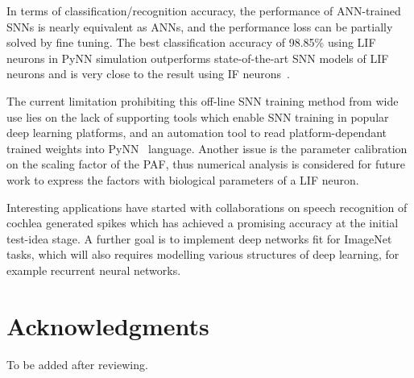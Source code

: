 \documentclass{article}
\begin{document}
In terms of classification/recognition accuracy, the performance of ANN-trained SNNs is nearly equivalent as ANNs, and the performance loss can be partially solved by fine tuning.
The best classification accuracy of 98.85\% using LIF neurons in PyNN simulation outperforms state-of-the-art SNN models of LIF neurons and is very close to the result using IF neurons~\cite{diehl2015fast}.

The current limitation prohibiting this off-line SNN training method from wide use lies on the lack of supporting tools which enable SNN training in popular deep learning platforms, and an automation tool to read platform-dependant trained weights into PyNN~\cite{davison2008pynn} language.
Another issue is the parameter calibration on the scaling factor of the PAF, thus numerical analysis is considered for future work to express the factors with biological parameters of a LIF neuron.

Interesting applications have started with collaborations on speech recognition of cochlea generated spikes which has achieved a promising accuracy at the initial test-idea stage.
A further goal is to implement deep networks fit for ImageNet~\cite{deng2009imagenet} tasks, which will also requires modelling various structures of deep learning, for example recurrent neural networks.

\section*{Acknowledgments}
To be added after reviewing.
\end{document}
